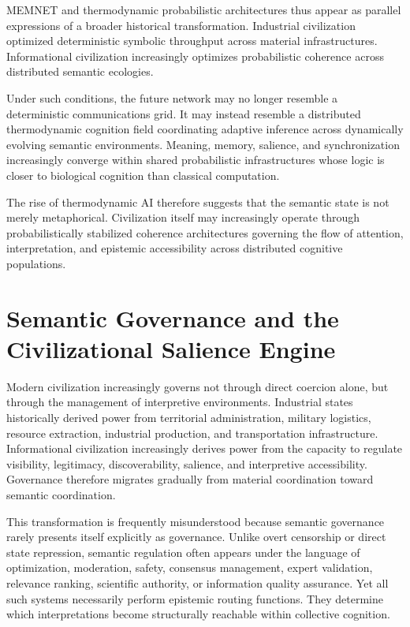 \documentclass[11pt,a4paper]{article}
\begin{document}
MEMNET and thermodynamic probabilistic architectures thus appear as parallel expressions of a broader historical transformation. Industrial civilization optimized deterministic symbolic throughput across material infrastructures. Informational civilization increasingly optimizes probabilistic coherence across distributed semantic ecologies.

Under such conditions, the future network may no longer resemble a deterministic communications grid. It may instead resemble a distributed thermodynamic cognition field coordinating adaptive inference across dynamically evolving semantic environments. Meaning, memory, salience, and synchronization increasingly converge within shared probabilistic infrastructures whose logic is closer to biological cognition than classical computation.

The rise of thermodynamic AI therefore suggests that the semantic state is not merely metaphorical. Civilization itself may increasingly operate through probabilistically stabilized coherence architectures governing the flow of attention, interpretation, and epistemic accessibility across distributed cognitive populations.

\section{Semantic Governance and the Civilizational Salience Engine}

Modern civilization increasingly governs not through direct coercion alone, but through the management of interpretive environments. Industrial states historically derived power from territorial administration, military logistics, resource extraction, industrial production, and transportation infrastructure. Informational civilization increasingly derives power from the capacity to regulate visibility, legitimacy, discoverability, salience, and interpretive accessibility. Governance therefore migrates gradually from material coordination toward semantic coordination.

This transformation is frequently misunderstood because semantic governance rarely presents itself explicitly as governance. Unlike overt censorship or direct state repression, semantic regulation often appears under the language of optimization, moderation, safety, consensus management, expert validation, relevance ranking, scientific authority, or information quality assurance. Yet all such systems necessarily perform epistemic routing functions. They determine which interpretations become structurally reachable within collective cognition.
\end{document}
